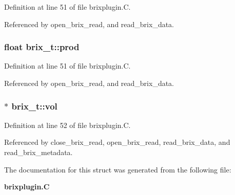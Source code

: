 Definition at line 51 of file brixplugin.C.

Referenced by open\_\-brix\_\-read, and read\_\-brix\_\-data.
\subsubsection{\setlength{\rightskip}{0pt plus 5cm}float brix\_\-t::prod}\label{structbrix__t_m2}




Definition at line 51 of file brixplugin.C.

Referenced by open\_\-brix\_\-read, and read\_\-brix\_\-data.
\subsubsection{$\ast$ brix\_\-t::vol}\label{structbrix__t_m4}




Definition at line 52 of file brixplugin.C.

Referenced by close\_\-brix\_\-read, open\_\-brix\_\-read, read\_\-brix\_\-data, and read\_\-brix\_\-metadata.

The documentation for this struct was generated from the following file:\begin{CompactItemize}
\item 
{\bf brixplugin.C}\end{CompactItemize}
